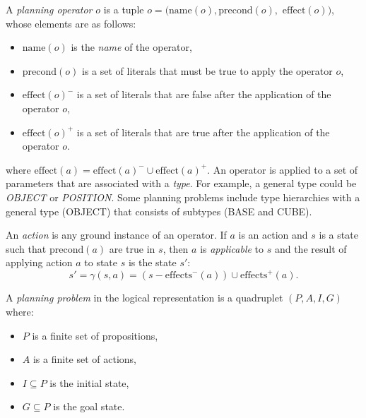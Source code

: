 \begin{definition}
A \textit{planning operator} $o$ is a tuple $o = (\text{name}(o), \text{precond}(o),$ $\text{effect}(o))$, whose elements are as follows:
\begin{itemize}
	\item $\text{name}(o)$ is the {\em name} of the operator,
	\item $\text{precond}(o)$ is a set of literals that must be true to apply the operator $o$,
	\item $\text{effect}(o)^{-}$ is a set of literals that are false after the application of the operator $o$,
	\item $\text{effect}(o)^{+}$ is a set of literals that are true after the application of the operator $o$.
\end{itemize}
\end{definition}
where $\text{effect}(a) = \text{effect}(a)^{-} \cup \text{effect}(a)^{+}$. 
An operator is applied to a set of parameters that are associated with a \textit{type}.
For example, a general type could be \textit{OBJECT} or \textit{POSITION}.
Some planning problems include type hierarchies with a general type (\eg OBJECT) that consists of subtypes (\eg BASE and CUBE).

\begin{definition}
	An \textit{action} is any ground instance of an operator. If $a$ is an action and $s$ is a state such that $\text{precond}(a)$ are true in $s$, then $a$ is {\em applicable} to $s$ and the result of applying action $a$ to state $s$ is the state $s'$:  
	\[s' = \gamma(s, a) = (s - \text{effects}^{-}(a)) \cup \text{effects}^{+}(a).\]
\end{definition}


\begin{definition}
A \textit{planning problem} in the logical representation is a quadruplet $(P, A, I, G)$ where:
\begin{itemize}
	\item $P$ is a finite set of propositions,
	\item $A$ is a finite set of actions,%
	\item $I \subseteq P$ is the initial state,
	\item $G \subseteq P$ is the goal state.
\end{itemize}
\end{definition}


